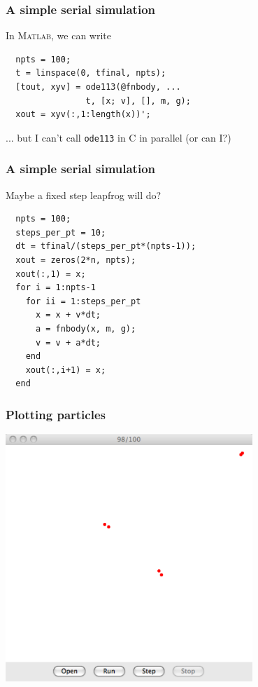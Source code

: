 \documentclass{beamer}
\begin{document}
\begin{frame}[fragile]
  \frametitle{A simple serial simulation}

  In \textsc{Matlab}, we can write
\begin{verbatim}
  npts = 100;
  t = linspace(0, tfinal, npts);
  [tout, xyv] = ode113(@fnbody, ...
                t, [x; v], [], m, g);
  xout = xyv(:,1:length(x))';
\end{verbatim}
  ... but I can't call {\tt ode113} in C in parallel (or can I?)

\end{frame}


\begin{frame}[fragile]
  \frametitle{A simple serial simulation}

  Maybe a fixed step leapfrog will do?
\begin{verbatim}
  npts = 100;
  steps_per_pt = 10;
  dt = tfinal/(steps_per_pt*(npts-1));
  xout = zeros(2*n, npts);
  xout(:,1) = x;
  for i = 1:npts-1
    for ii = 1:steps_per_pt
      x = x + v*dt;
      a = fnbody(x, m, g);
      v = v + a*dt;
    end
    xout(:,i+1) = x;
  end
\end{verbatim}

\end{frame}


\begin{frame}
  \frametitle{Plotting particles}

  \begin{center}
    \includegraphics[width=0.7\textwidth]{lec05bouncy.pdf}
  \end{center}
\end{frame}
\end{document}
